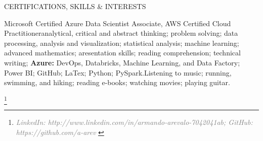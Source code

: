 \documentclass{resume}
\begin{document}
\begin{Section}{CERTIFICATIONS, SKILLS \& INTERESTS}

\begin{csiSection}{Microsoft Certified Azure Data Scientist Associate, AWS Certified Cloud Practitioner}{analytical, critical and abstract thinking; problem solving; data processing, analysis and visualization; statistical analysis; machine learning; advanced mathematics; aresentation skills; reading comprehension; technical writing; \textbf{Azure:} DevOps, Databricks, Machine Learning, and Data Factory; Power BI; GitHub; LaTex; Python; PySpark.}{Listening to music; running, swimming, and hiking; reading e-books; watching movies; playing guitar.}
\end{csiSection}

\end{Section}


 \let\thefootnote\relax\footnote{\footnotesize \textcolor{gray}{\hfil \textit{LinkedIn: http://www.linkedin.com/in/armando-arevalo-7042041ab; GitHub: https://github.com/a-arev} \hfil}} 

\end{document}
